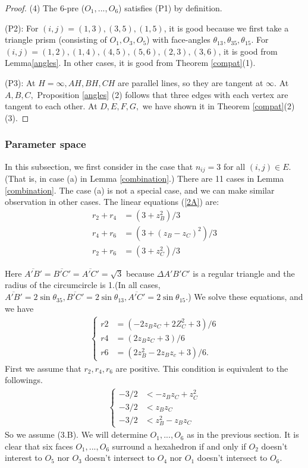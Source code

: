 \documentclass[suppldata, dvipdfmx]{interact}
\theoremstyle{plain}%
\theoremstyle{definition}
\theoremstyle{remark}
\theoremstyle{problemstyle}
\begin{document}
\begin{proof}
(4) The 6-pre ($O_1, ..., O_6$) satisfies (P1) by definition.

(P2): For $(i, j) = (1, 3), (3, 5), (1, 5)$, it is good because we first
 take a triangle prism (consisting of $O_1, O_3, O_5$) with face-angles
 $\theta_{13}, \theta_{35}, \theta_{15}.$ 
For $(i, j) = (1, 2), (1, 4), (4, 5), (5, 6), (2, 3), (3, 6)$, it is
 good from Lemma\ref{angles}. In other cases, it is good from Theorem
 \ref{compat}(1).

(P3): At $H = \infty, AH, BH, CH$ are parallel lines, so they are tangent
 at $\infty$. At $A, B, C,$ Proposition \ref{angles} (2) follows that three edges
 with each vertex are tangent to each other. At $D, E, F, G,$ we have
 shown it in Theorem \ref{compat}(2)(3). 
\end{proof}

\subsubsection{Parameter space}\label{paramSpace}
In this subsection, we first consider in the case that $n_{ij} = 3$ for all
$(i, j) \in E$. (That is, in case (a) in Lemma \ref{combination}.) There
are 11 cases in Lemma \ref{combination}.
The case (a) is not a special case, and we can make
similar observation in other cases.
The linear equations (\ref{2A}) are:
\begin{align*}
 r_2 + r_4 &= (3 + z_B^2) / 3 \\
 r_4 + r_6 &= (3 + (z_B - z_C)^2 ) / 3 \\
 r_2 + r_6 &= (3 + z_C^2) / 3
\end{align*}

Here $\overline{A'B'} = \overline{B'C'} = \overline{A'C'} = \sqrt{3}$
because $\Delta{A'B'C'}$ is a regular triangle and the radius of the
circumcircle is 1.(In all cases, $\overline{A'B'} = 2\sin\theta_{35},
\overline{B'C'} = 2\sin\theta_{13}, \overline{A'C'} = 2\sin\theta_{15}$.)
We solve these equations, and we have 
\begin{align*}
\begin{cases}
 r2 &= (-2z_Bz_C + 2Z^2_C + 3) / 6 \\
 r4 &= (2z_Bz_C + 3) / 6 \tag{2.C}\label{2C}\\
 r6 &= (2z^2_B - 2z_Bz_c + 3) / 6.
 \end{cases}
\end{align*}
First we assume that $r_2, r_4, r_6$ are positive. This condition is
equivalent to the followings.
\begin{align*}
\begin{cases}
 -3 / 2 &< -z_Bz_C + z^2_C\\
 -3 / 2 &< z_Bz_C \tag{2.D}\label{2D}\\
 -3 / 2 &< z^2_B - z_Bz_C
\end{cases}
\end{align*}
So we assume (3.B). We will determine $O_1, ... , O_6$ as in the
previous section. It is clear that six faces $O_1, ... , O_6$ surround
a hexahedron if and only if $O_2$ doesn't interest to $O_5$ nor $O_3$
doesn't intersect to $O_4$ nor $O_1$ doesn't intersect to $O_6$.
\end{document}
